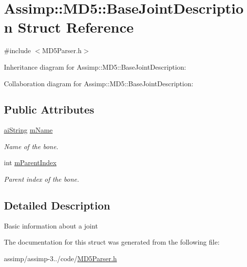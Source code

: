 \hypertarget{struct_assimp_1_1_m_d5_1_1_base_joint_description}{\section{Assimp\+:\+:M\+D5\+:\+:Base\+Joint\+Description Struct Reference}
\label{struct_assimp_1_1_m_d5_1_1_base_joint_description}
}


{\ttfamily \#include $<$M\+D5\+Parser.\+h$>$}



Inheritance diagram for Assimp\+:\+:M\+D5\+:\+:Base\+Joint\+Description\+:


Collaboration diagram for Assimp\+:\+:M\+D5\+:\+:Base\+Joint\+Description\+:
\subsection*{Public Attributes}
\begin{DoxyCompactItemize}
\item 
\hypertarget{struct_assimp_1_1_m_d5_1_1_base_joint_description_a9561c052a5aefc657cd1c4ff23ce2dd7}{\hyperlink{structai_string}{ai\+String} \hyperlink{struct_assimp_1_1_m_d5_1_1_base_joint_description_a9561c052a5aefc657cd1c4ff23ce2dd7}{m\+Name}}\label{struct_assimp_1_1_m_d5_1_1_base_joint_description_a9561c052a5aefc657cd1c4ff23ce2dd7}

\begin{DoxyCompactList}\small\item\em Name of the bone. \end{DoxyCompactList}\item 
\hypertarget{struct_assimp_1_1_m_d5_1_1_base_joint_description_a47ea482470957d990101c10e98e686ab}{int \hyperlink{struct_assimp_1_1_m_d5_1_1_base_joint_description_a47ea482470957d990101c10e98e686ab}{m\+Parent\+Index}}\label{struct_assimp_1_1_m_d5_1_1_base_joint_description_a47ea482470957d990101c10e98e686ab}

\begin{DoxyCompactList}\small\item\em Parent index of the bone. \end{DoxyCompactList}\end{DoxyCompactItemize}


\subsection{Detailed Description}
Basic information about a joint 

The documentation for this struct was generated from the following file\+:\begin{DoxyCompactItemize}
\item 
assimp/assimp-\/3../code/\hyperlink{_m_d5_parser_8h}{M\+D5\+Parser.\+h}\end{DoxyCompactItemize}
